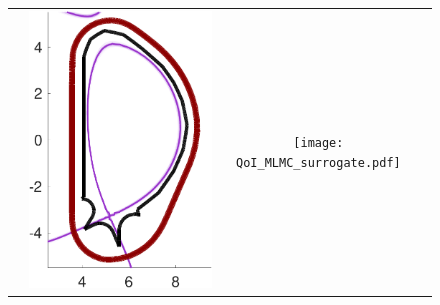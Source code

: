 \documentclass{beamer}
\begin{document}
\begin{frame}[t]
\begin{itemize}[leftmargin=5pt]
\begin{figure}[ht!]
{\begin{tabular}{cccc}
&\includegraphics[width=1\linewidth]{QoI_MLMC_uniform_L2norm.pdf} 
&\texttt{[image: QoI\_MLMC\_surrogate.pdf]} 
\\

\end{tabular}}
\end{figure}
\end{itemize}
\end{frame}
\end{document}

